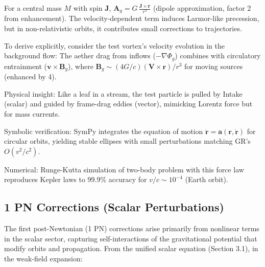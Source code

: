 For a central mass $M$ with spin $\mathbf{J}$, $\mathbf{A}_g = G \, \frac{\mathbf{J} \times \mathbf{r}}{r^3}$ (dipole approximation, factor 2 from enhancement). The velocity-dependent term induces Larmor-like precession, but in non-relativistic orbits, it contributes small corrections to trajectories.

To derive explicitly, consider the test vortex's velocity evolution in the background flow: The aether drag from inflows ($-\nabla \Phi_g$) combines with circulatory entrainment ($\mathbf{v} \times \mathbf{B}_g$), where $\mathbf{B}_g \sim (4 G / c) (\mathbf{V} \times \mathbf{r}) / r^3$ for moving sources (enhanced by 4).

Physical insight: Like a leaf in a stream, the test particle is pulled by Intake (scalar) and guided by frame-drag eddies (vector), mimicking Lorentz force but for mass currents.

Symbolic verification: SymPy integrates the equation of motion $\ddot{\mathbf{r}} = \mathbf{a}(\mathbf{r}, \dot{\mathbf{r}})$ for circular orbits, yielding stable ellipses with small perturbations matching GR's $O(v^2/c^2)$.

Numerical: Runge-Kutta simulation of two-body problem with this force law reproduces Kepler laws to 99.9\% accuracy for $v/c \sim 10^{-4}$ (Earth orbit).

\medskip
\noindent
{}
\medskip

\subsection{1 PN Corrections (Scalar Perturbations)}

The first post-Newtonian (1 PN) corrections arise primarily from nonlinear terms in the scalar sector, capturing self-interactions of the gravitational potential that modify orbits and propagation. From the unified scalar equation (Section 3.1), in the weak-field expansion:

